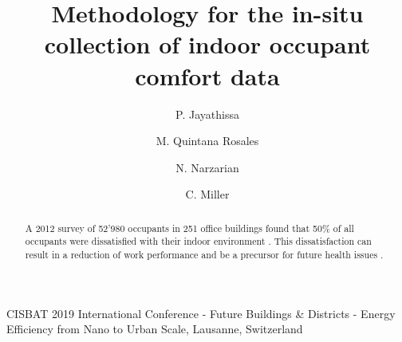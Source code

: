 \documentclass[preprint,11pt,3p]{elsarticle} %
\begin{document}
\begin{frontmatter}


\begin{center}
{CISBAT 2019 International Conference - Future Buildings \& Districts - Energy Efficiency from Nano to Urban Scale, Lausanne, Switzerland}
\end{center}

\title{Methodology for the in-situ collection of indoor occupant comfort data} 


\author[buds]{P. Jayathissa}
\address[buds]{Building and Urban Data Science Group,  Department of Building, Singapore} 

\author[buds]{M. Quintana Rosales}


\author[unsw]{N. Narzarian}
\address[unsw]{University of New South Wales, Australia}



\author[buds]{C. Miller  }




\begin{abstract}

A 2012 survey of 52'980 occupants in 251 office buildings found that 50\% of all occupants were dissatisfied with their indoor environment \cite{frontczak2012quantitative}. This dissatisfaction can result in a reduction of work performance \cite{wargocki2007effects} and be a precursor for future health issues \cite{jaakkola1989sick}. \\


\end{abstract}
\end{frontmatter}
\end{document}
